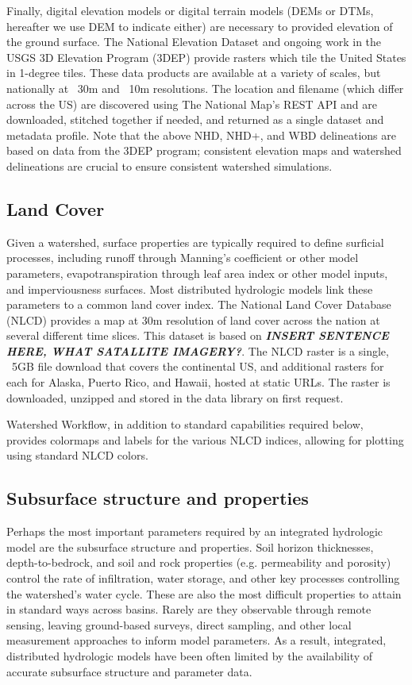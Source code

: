 \documentclass[a4paper,fleqn]{cas-dc}
\begin{document}
Finally, digital elevation models or digital terrain models (DEMs or DTMs, hereafter we use DEM to indicate either) are necessary to provided elevation of the ground surface.
The National Elevation Dataset and ongoing work in the USGS 3D Elevation Program (3DEP) provide rasters which tile the United States in 1-degree tiles.\cite{NED}
These data products are available at a variety of scales, but nationally at ~30m and ~10m resolutions.
The location and filename (which differ across the US) are discovered using The National Map's REST API and are downloaded, stitched together if needed, and returned as a single dataset and metadata profile.
Note that the above NHD, NHD+, and WBD delineations are based on data from the 3DEP program; consistent elevation maps and watershed delineations are crucial to ensure consistent watershed simulations.

\subsection{Land Cover}\label{ssc:acquisition:land_cover}
%
Given a watershed, surface properties are typically required to define surficial processes, including runoff through Manning's coefficient or other model parameters, evapotranspiration through leaf area index or other model inputs, and imperviousness surfaces.
Most distributed hydrologic models link these parameters to a common land cover index.
The National Land Cover Database (NLCD)\cite{NLCD} provides a map at 30m resolution of land cover across the nation at several different time slices.
This dataset is based on \emph{\bf{INSERT SENTENCE HERE, WHAT SATALLITE IMAGERY?}}.
The NLCD raster is a single, ~5GB file download that covers the continental US, and additional rasters for each for Alaska, Puerto Rico, and Hawaii, hosted at static URLs.
The raster is downloaded, unzipped and stored in the data library on first request.

Watershed Workflow, in addition to standard capabilities required below, provides colormaps and labels for the various NLCD indices, allowing for plotting using standard NLCD colors.

\subsection{Subsurface structure and properties}\label{ssc:acquisition:soil}
%
Perhaps the most important parameters required by an integrated hydrologic model are the subsurface structure and properties.
Soil horizon thicknesses, depth-to-bedrock, and soil and rock properties (e.g. permeability and porosity) control the rate of infiltration, water storage, and other key processes controlling the watershed's water cycle.
These are also the most difficult properties to attain in standard ways across basins.
Rarely are they observable through remote sensing, leaving ground-based surveys, direct sampling, and other local measurement approaches to inform model parameters.
As a result, integrated, distributed hydrologic models have been often limited by the availability of accurate subsurface structure and parameter data.
\end{document}
